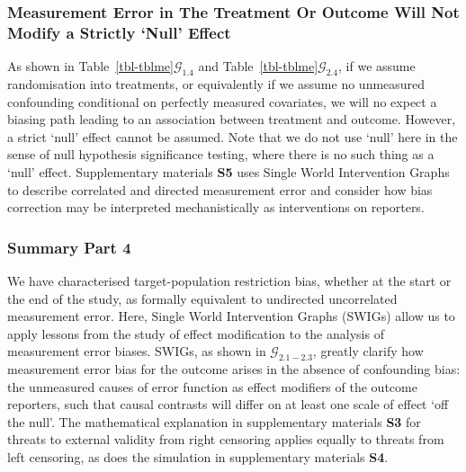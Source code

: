 \documentclass[
  single column]{article}
\begin{document}
\subsubsection{Measurement Error in The Treatment Or Outcome Will Not
Modify a Strictly `Null'
Effect}\label{measurement-error-in-the-treatment-or-outcome-will-not-modify-a-strictly-null-effect}

As shown in Table~\ref{tbl-tblme}\(\mathcal{G}_{1.4}\) and
Table~\ref{tbl-tblme}\(\mathcal{G}_{2.4}\), if we assume randomisation
into treatments, or equivalently if we assume no unmeasured confounding
conditional on perfectly measured covariates, we will no expect a
biasing path leading to an association between treatment and outcome.
However, a strict `null' effect cannot be assumed. Note that we do not
use `null' here in the sense of null hypothesis significance testing,
where there is no such thing as a `null' effect. Supplementary materials
\textbf{S5} uses Single World Intervention Graphs to describe correlated
and directed measurement error and consider how bias correction may be
interpreted mechanistically as interventions on reporters.

\subsubsection{Summary Part 4}\label{summary-part-4}

We have characterised target-population restriction bias, whether at the
start or the end of the study, as formally equivalent to undirected
uncorrelated measurement error. Here, Single World Intervention Graphs
(SWIGs) allow us to apply lessons from the study of effect modification
to the analysis of measurement error biases. SWIGs, as shown in
\(\mathcal{G}_{2.1-2.3}\), greatly clarify how measurement error bias
for the outcome arises in the absence of confounding bias: the
unmeasured causes of error function as effect modifiers of the outcome
reporters, such that causal contrasts will differ on at least one scale
of effect `off the null'. The mathematical explanation in supplementary
materials \textbf{S3} for threats to external validity from right
censoring applies equally to threats from left censoring, as does the
simulation in supplementary materials \textbf{S4}.
\end{document}
